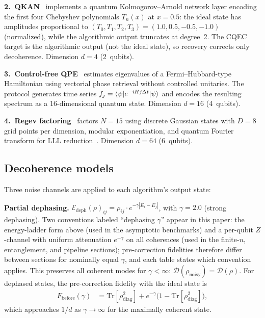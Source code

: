 \documentclass[pra,twocolumn,superscriptaddress,longbibliography,floatfix]{revtex4-2}
\begin{document}
\textbf{2.\ QKAN}~\cite{Ivashkov2024} implements a quantum Kolmogorov--Arnold network layer encoding the first four Chebyshev polynomials $T_n(x)$ at $x = 0.5$: the ideal state has amplitudes proportional to $(T_0, T_1, T_2, T_3) = (1.0, 0.5, -0.5, -1.0)$ (normalized), while the algorithmic output truncates at degree~2.
The CQEC target is the algorithmic output (not the ideal state), so recovery corrects only decoherence.
Dimension $d = 4$ (2~qubits).

\textbf{3.\ Control-free QPE}~\cite{Clinton2026} estimates eigenvalues of a Fermi--Hubbard-type Hamiltonian using vectorial phase retrieval without controlled unitaries.
The protocol generates time series $f_j = \braket{\psi | e^{-iHj\Delta t} | \psi}$ and encodes the resulting spectrum as a 16-dimensional quantum state.
Dimension $d = 16$ (4~qubits).

\textbf{4.\ Regev factoring}~\cite{Regev2024} factors $N = 15$ using discrete Gaussian states with $D = 8$ grid points per dimension, modular exponentiation, and quantum Fourier transform for LLL reduction~\cite{LLL1982}.
Dimension $d = 64$ (6~qubits).


\subsection{Decoherence models}
\label{sec:noise}

Three noise channels are applied to each algorithm's output state:

\textbf{Partial dephasing.}
$\mathcal{E}_\mathrm{deph}(\rho)_{ij} = \rho_{ij} \cdot e^{-\gamma|E_i - E_j|}$, with $\gamma = 2.0$ (strong dephasing).
Two conventions labeled ``dephasing $\gamma$'' appear in this paper: the energy-ladder form above (used in the asymptotic benchmarks) and a per-qubit $Z$-channel with uniform attenuation $e^{-\gamma}$ on all coherences (used in the finite-$n$, entanglement, and pipeline sections); pre-correction fidelities therefore differ between sections for nominally equal $\gamma$, and each table states which convention applies.
This preserves all coherent modes for $\gamma < \infty$: $\mathcal{D}(\rho_\mathrm{noisy}) = \mathcal{D}(\rho)$.
For dephased states, the pre-correction fidelity with the ideal state is
\begin{align}
F_\mathrm{before}(\gamma) &= \mathrm{Tr}[\rho_\mathrm{diag}^2] + e^{-\gamma}\bigl(1 - \mathrm{Tr}[\rho_\mathrm{diag}^2]\bigr),
\label{eq:fidelity_decay}
\end{align}
which approaches $1/d$ as $\gamma \to \infty$ for the maximally coherent state.
\end{document}
